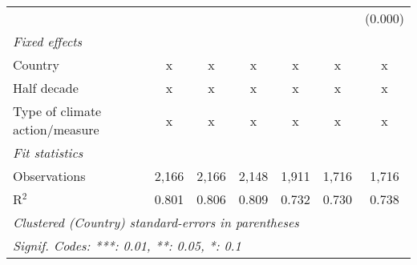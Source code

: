 \begin{tabular}{lcccccc}
                                                &         &                &                &                &                & (0.000)\\   
   \emph{Fixed effects}\\
   Country                                      & x       & x              & x              & x              & x              & x\\  
   Half decade                                  & x       & x              & x              & x              & x              & x\\  
   Type of climate action/measure               & x       & x              & x              & x              & x              & x\\  
   \midrule \emph{Fit statistics}\\
   Observations                                 & 2,166   & 2,166          & 2,148          & 1,911          & 1,716          & 1,716\\  
   R$^2$                                        & 0.801   & 0.806          & 0.809          & 0.732          & 0.730          & 0.738\\  
   \midrule
   \multicolumn{7}{l}{\emph{Clustered (Country) standard-errors in parentheses}}\\
   \multicolumn{7}{l}{\emph{Signif. Codes: ***: 0.01, **: 0.05, *: 0.1}}\\
\end{tabular}
\par\endgroup


